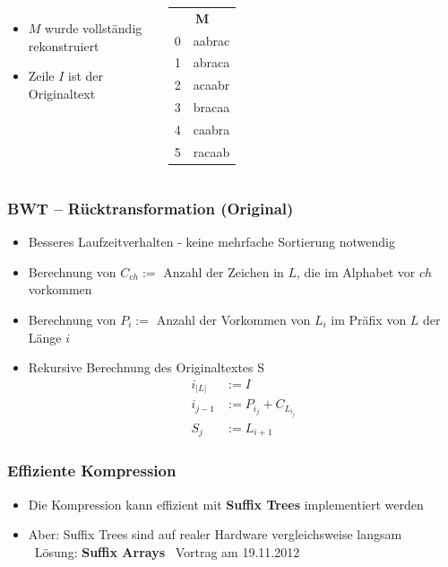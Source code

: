 \documentclass[14pt,xcolor=dvipsnames,pdftex]{beamer}
\begin{document}
\begin{frame}[allowframebreaks]
\begin{columns}
\end{columns}
\framebreak
\begin{columns}
\begin{itemize}
 \item $M$ wurde vollständig rekonstruiert
 \item Zeile $I$ ist der {\color{red}Originaltext}
\end{itemize}
\begin{tabular}{c|T}
     \\
    0 & aabrac \\
    {\color{red}1} & {\color{red}abraca}\\
    2 & acaabr \\
    3 & bracaa \\
    4 & caabra \\
    5 & racaab
\end{tabular}
\end{columns}
\end{frame}
\begin{frame}
\frametitle{BWT -- Rücktransformation (Original)}
\begin{itemize}
 \item Besseres Laufzeitverhalten - keine mehrfache Sortierung notwendig
 \item Berechnung von $C_{ch} := $ Anzahl der Zeichen in $L$, die im Alphabet vor $ch$ vorkommen
 \item Berechnung von $P_i := $ Anzahl der Vorkommen von $L_i$ im Präfix von $L$ der Länge $i$
 \item Rekursive Berechnung des Originaltextes S
 \begin{align}
 i_{|L|} &:= I\\
 i_{j-1} &:= P_{i_j} + C_{L_{i_j}}\\
 S_j &:= L_{i+1}
 \end{align}
\end{itemize}
\end{frame}
\begin{frame}
\frametitle{Effiziente Kompression}
\begin{itemize}
\item Die Kompression kann effizient mit \textbf{Suffix Trees} implementiert werden
\item Aber: Suffix Trees sind auf realer Hardware vergleichsweise langsam \\
\textrightarrow\ Lösung: \textbf{Suffix Arrays} \textrightarrow\ Vortrag am 19.11.2012
\end{itemize}
\end{frame}
\end{document}
